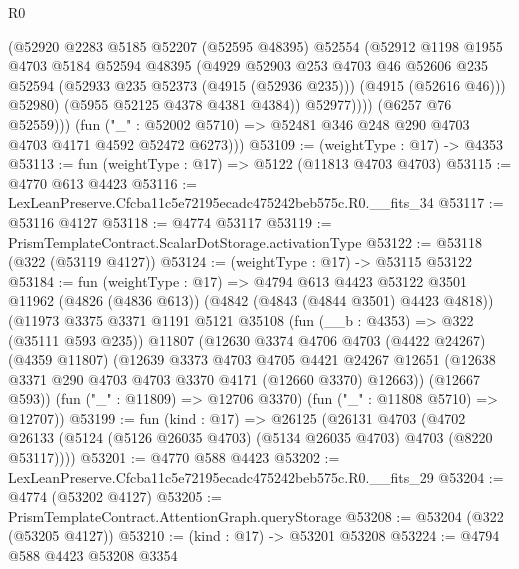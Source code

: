 \begin{lexlean}{R0}
\begin{coremodule}
                    (@52920
                      @2283
                      @5185
                      @52207
                      (@52595 @48395)
                      @52554
                      (@52912
                        @1198
                        @1955
                        @4703
                        @5184
                        @52594
                        @48395
                        (@4929
                          @52903
                          @253
                          @4703
                          @46
                          @52606
                          @235
                          @52594
                          (@52933 @235 @52373 (@4915 (@52936 @235)))
                          (@4915 (@52616 @46)))
                        @52980)
                      (@5955 @52125 @4378 @4381 @4384))
                    @52977))))
            (@6257 @76 @52559)))
        (fun ("_" : @52002 @5710) => @52481 @346 @248 @290 @4703 @4703 @4171 @4592 @52472 @6273)))
@53109 := (weightType : @17) -> @4353
@53113 := fun (weightType : @17) => @5122 (@11813 @4703 @4703)
@53115 := @4770 @613 @4423
@53116 := LexLeanPreserve.Cfcba11c5e72195ecadc475242beb575c.R0.__fits_34
@53117 := @53116 @4127
@53118 := @4774 @53117
@53119 := PrismTemplateContract.ScalarDotStorage.activationType
@53122 := @53118 (@322 (@53119 @4127))
@53124 := (weightType : @17) -> @53115 @53122
@53184 := fun (weightType : @17) =>
  @4794
    @613
    @4423
    @53122
    @3501
    @11962
    (@4826 (@4836 @613))
    (@4842 (@4843 (@4844 @3501) @4423 @4818))
    (@11973
      @3375
      @3371
      @1191
      @5121
      @35108
      (fun (__b : @4353) => @322 (@35111 @593 @235))
      @11807
      (@12630
        @3374
        @4706
        @4703
        (@4422 @24267)
        (@4359 @11807)
        (@12639
          @3373
          @4703
          @4705
          @4421
          @24267
          @12651
          (@12638 @3371 @290 @4703 @4703 @3370 @4171 (@12660 @3370) @12663))
        (@12667 @593))
      (fun ("_" : @11809) => @12706 @3370)
      (fun ("_" : @11808 @5710) => @12707))
@53199 := fun (kind : @17) =>
  @26125
    (@26131
      @4703
      (@4702 @26133 (@5124 (@5126 @26035 @4703) (@5134 @26035 @4703) @4703 (@8220 @53117))))
@53201 := @4770 @588 @4423
@53202 := LexLeanPreserve.Cfcba11c5e72195ecadc475242beb575c.R0.__fits_29
@53204 := @4774 (@53202 @4127)
@53205 := PrismTemplateContract.AttentionGraph.queryStorage
@53208 := @53204 (@322 (@53205 @4127))
@53210 := (kind : @17) -> @53201 @53208
@53224 := @4794
    @588
    @4423
    @53208
    @3354

\end{coremodule}
\end{lexlean}
